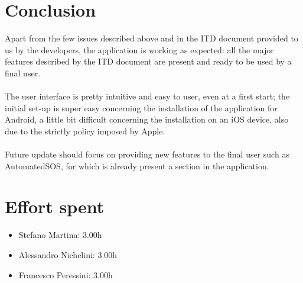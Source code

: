 \documentclass{article}
\begin{document}
\section{Conclusion}
Apart from the few issues described above and in the ITD document provided to us by the developers, the application is working as expected: all the major features described by the ITD document are present and ready to be used by a final user. \\\\
The user interface is pretty intuitive and easy to user, even at a first start; the initial set-up is super easy concerning the installation of the application for Android, a little bit difficult concerning the installation on an iOS device, also due to the strictly policy imposed by Apple. \\\\
Future update should focus on providing new features to the final user such as AutomatedSOS, for which is already present a section in the application.

\newpage
\section{Effort spent}
\begin{itemize}
	\item Stefano Martina: 3.00h
	\item Alessandro Nichelini: 3.00h
	\item Francesco Peressini: 3.00h
\end{itemize}
\end{document}
